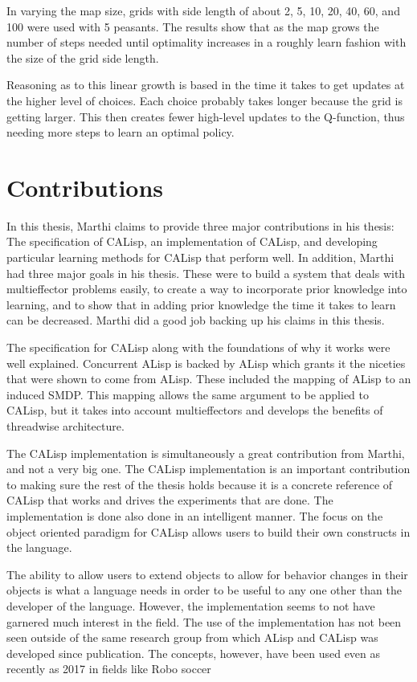 \documentclass[jair,twoside,11pt,theapa]{article}
\begin{document}
In varying the map size, grids with side length of about 2, 5, 10, 20, 40, 60, and 100 were used with 5 peasants. The results show that as the map grows the number of steps needed until optimality increases in a roughly learn fashion with the size of the grid side length.

Reasoning as to this linear growth is based in the time it takes to get updates at the higher level of choices. Each choice probably takes longer because the grid is getting larger. This then creates fewer high-level updates to the Q-function, thus needing more steps to learn an optimal policy.

\section{Contributions}
\label{Contribs}
In this thesis, Marthi claims to provide three major contributions in his thesis: The specification of CALisp, an implementation of CALisp, and developing particular learning methods for CALisp that perform well. In addition, Marthi had three major goals in his thesis. These were to build a system that deals with multieffector problems easily, to create a way to incorporate prior knowledge into learning, and to show that in adding prior knowledge the time it takes to learn can be decreased. Marthi did a good job backing up his claims in this thesis. 

The specification for CALisp along with the foundations of why it works were well explained. Concurrent ALisp is backed by ALisp which grants it the niceties that were shown to come from ALisp. These included the mapping of ALisp to an induced SMDP. This mapping allows the same argument to be applied to CALisp, but it takes into account multieffectors and develops the benefits of threadwise architecture. 

The CALisp implementation is simultaneously a great contribution from Marthi, and not a very big one. The CALisp implementation is an important contribution to making sure the rest of the thesis holds because it is a concrete reference of CALisp that works and drives the experiments that are done. The implementation is done also done in an intelligent manner. The focus on the object oriented paradigm for CALisp allows users to build their own constructs in the language. 

The ability to allow users to extend objects to allow for behavior changes in their objects is what a language needs in order to be useful to any one other than the developer of the language. However, the implementation seems to not have garnered much interest in the field. The use of the implementation has not been seen outside of the same research group from which ALisp and CALisp was developed since publication. The concepts, however, have been used even as recently as 2017 in fields like Robo soccer \cite{CHRLKeepaway:2017}
\end{document}
